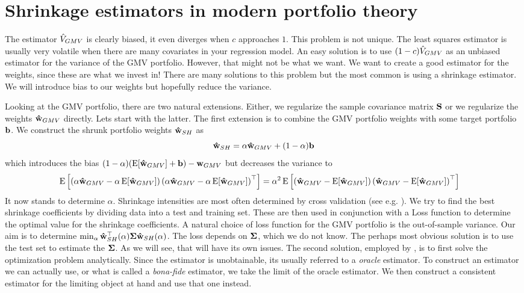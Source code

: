 \documentclass[oneside]{book}\usepackage{knitr}
\begin{document}
\section{Shrinkage estimators in modern portfolio theory}
The estimator $\hat{V}_{GMV}$ is clearly biased, it even diverges when $c$ approaches $1$. 
This problem is not unique. 
The least squares estimator is usually very volatile when there are many covariates in your regression model. 
An easy solution is to use $(1-c)\hat{V}_{GMV}$ as an unbiased estimator for the variance of the GMV portfolio.
However, that might not be what we want. 
We want to create a good estimator for the weights, since these are what we invest in! 
There are many solutions to this problem but the most common is using a shrinkage estimator. 
We will introduce bias to our weights but hopefully reduce the variance.

Looking at the GMV portfolio, there are two natural extensions. Either, we regularize the sample covariance matrix $\mathbf{S}$ or we regularize the weights $\mathbf{\hat{w}}_{GMV}$ directly. Lets start with the latter. The first extension is to combine the GMV portfolio weights with some target portfolio $\mathbf{b}$. We construct the shrunk portfolio weights $\mathbf{\hat{w}}_{SH}$ as
\begin{equation}
  \mathbf{\hat{w}}_{SH} = \alpha\mathbf{\hat{w}}_{GMV} + (1-\alpha)\mathbf{b}
\end{equation}
which introduces the bias $(1-\alpha)(\operatorname{E}[\mathbf{\hat{w}}_{GMV}]+\mathbf{b}) - \mathbf{w}_{GMV}$ but decreases the variance to
\begin{align}
  \operatorname{E}\left[\left(\alpha\mathbf{\hat{w}}_{GMV} - \alpha \operatorname{E}[\mathbf{\hat{w}}_{GMV}]\right)\left(\alpha\mathbf{\hat{w}}_{GMV} - \alpha \operatorname{E}[\mathbf{\hat{w}}_{GMV}]\right)^\top\right] 
  & = 
  \alpha^2\operatorname{E}\left[\left(\mathbf{\hat{w}}_{GMV} - \operatorname{E}[\mathbf{\hat{w}}_{GMV}]\right)\left(\mathbf{\hat{w}}_{GMV} - \operatorname{E}[\mathbf{\hat{w}}_{GMV}]\right)^\top\right]
\end{align}
It now stands to determine $\alpha$. 
Shrinkage intensities are most often determined by cross validation (see e.g. \citet[ch. 5]{james2013introduction}). 
We try to find the best shrinkage coefficients by dividing data into a test and training set.
These are then used in conjunction with a Loss function to determine the optimal value for the shrinkage coefficients.
A natural choice of loss function for the GMV portfolio is the out-of-sample variance.
Our aim is to determine $\min_\alpha \mathbf{\hat{w}}_{SH}^\top(\alpha) \mathbf{\Sigma} \mathbf{\hat{w}}_{SH}(\alpha)$.
The loss depends on $\mathbf{\Sigma}$, which we do not know.
The perhaps most obvious solution is to use the test set to estimate the $\mathbf{\Sigma}$. 
As we will see, that will have its own issues.
The second solution, employed by \citet{bodnar2018estimation}, is to first solve the optimization problem analytically.
Since the estimator is unobtainable, its usually referred to a \textit{oracle} estimator. 
To construct an estimator we can actually use, or what is called a \textit{bona-fide} estimator, we take the limit of the oracle estimator.
We then construct a consistent estimator for the limiting object at hand and use that one instead.
\end{document}
